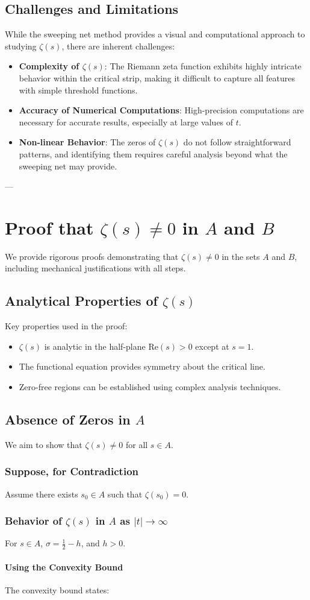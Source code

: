 \documentclass{article}
\begin{document}
\subsection{Challenges and Limitations} While the sweeping net method provides a visual and computational approach to studying $\zeta(s)$, there are inherent challenges: \begin{itemize} \item \textbf{Complexity of $\zeta(s)$}: The Riemann zeta function exhibits highly intricate behavior within the critical strip, making it difficult to capture all features with simple threshold functions. \item \textbf{Accuracy of Numerical Computations}: High-precision computations are necessary for accurate results, especially at large values of $t$. \item \textbf{Non-linear Behavior}: The zeros of $\zeta(s)$ do not follow straightforward patterns, and identifying them requires careful analysis beyond what the sweeping net may provide.
\end{itemize} --- \section{Proof that $\zeta(s) \neq 0$ in $A$ and $B$} We provide rigorous proofs demonstrating that $\zeta(s) \neq 0$ in the sets $A$ and $B$, including mechanical justifications with all steps. \subsection{Analytical Properties of $\zeta(s)$} Key properties used in the proof: \begin{itemize} \item $\zeta(s)$ is analytic in the half-plane $\mathrm{Re}(s) > 0$ except at $s = 1$. \item The functional equation provides symmetry about the critical line. \item Zero-free regions can be established using complex analysis techniques.
\end{itemize} \subsection{Absence of Zeros in $A$} We aim to show that $\zeta(s) \neq 0$ for all $s \in A$. \subsubsection{Suppose, for Contradiction} Assume there exists $s_0 \in A$ such that $\zeta(s_0) = 0$. \subsubsection{Behavior of $\zeta(s)$ in $A$ as $|t| \to \infty$} For $s \in A$, $\sigma = \tfrac{1}{2} - h$, and $h > 0$. \paragraph{Using the Convexity Bound} The convexity bound states: \[
\]
\end{document}
